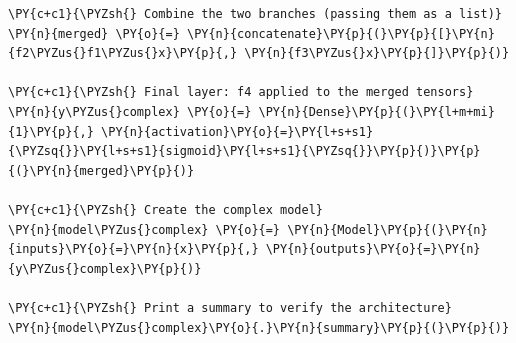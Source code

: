 \begin{Verbatim}[label=\makebox{\url{https://github.com/lucabaldini/cmepda/tree/master/slides/latex/snippets/functional_api_example.py}},commandchars=\\\{\}]
\PY{c+c1}{\PYZsh{} Combine the two branches (passing them as a list)}
\PY{n}{merged} \PY{o}{=} \PY{n}{concatenate}\PY{p}{(}\PY{p}{[}\PY{n}{f2\PYZus{}f1\PYZus{}x}\PY{p}{,} \PY{n}{f3\PYZus{}x}\PY{p}{]}\PY{p}{)}

\PY{c+c1}{\PYZsh{} Final layer: f4 applied to the merged tensors}
\PY{n}{y\PYZus{}complex} \PY{o}{=} \PY{n}{Dense}\PY{p}{(}\PY{l+m+mi}{1}\PY{p}{,} \PY{n}{activation}\PY{o}{=}\PY{l+s+s1}{\PYZsq{}}\PY{l+s+s1}{sigmoid}\PY{l+s+s1}{\PYZsq{}}\PY{p}{)}\PY{p}{(}\PY{n}{merged}\PY{p}{)}

\PY{c+c1}{\PYZsh{} Create the complex model}
\PY{n}{model\PYZus{}complex} \PY{o}{=} \PY{n}{Model}\PY{p}{(}\PY{n}{inputs}\PY{o}{=}\PY{n}{x}\PY{p}{,} \PY{n}{outputs}\PY{o}{=}\PY{n}{y\PYZus{}complex}\PY{p}{)}

\PY{c+c1}{\PYZsh{} Print a summary to verify the architecture}
\PY{n}{model\PYZus{}complex}\PY{o}{.}\PY{n}{summary}\PY{p}{(}\PY{p}{)}
\end{Verbatim}

